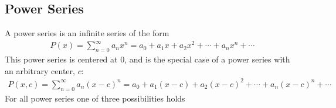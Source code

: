   \subsection{Power Series}
    A power series is an infinite series of the form
    \begin{align*}
      P(x) = \sum_{n=0}^{\infty} a_nx^n = a_0 + a_1x + a_2x^2 + \cdots + a_nx^n + \cdots
    \end{align*}
    This power series is centered at 0, and is the special case of a power series with an
    arbitrary center, $c$:
    \begin{align*}
      P(x,c) = \sum_{n=0}^{\infty} a_n(x-c)^n = a_0 + a_1(x-c) + a_2(x-c)^2 + \cdots + 
                                                                            a_n(x-c)^n + \cdots
    \end{align*}
    For all power series one of three possibilities holds
